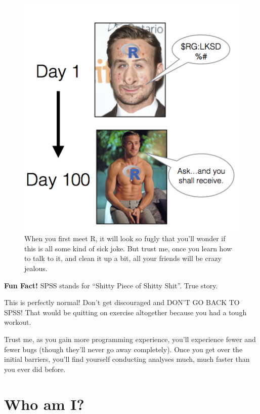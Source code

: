 \documentclass[]{book}
\theoremstyle{definition}
\theoremstyle{definition}
\theoremstyle{remark}
\begin{document}
\begin{figure}

{\centering \includegraphics{images/gosling} 

}

\caption{When you first meet R, it will look so fugly that you'll wonder if this is all some kind of sick joke. But trust me, once you learn how to talk to it, and clean it up a bit, all your friends will be crazy jealous.}\label{fig:unnamed-chunk-5}
\end{figure}

\textbf{Fun Fact!} SPSS stands for ``Shitty Piece of Shitty Shit''. True
story.

This is perfectly normal! Don't get discouraged and DON'T GO BACK TO
SPSS! That would be quitting on exercise altogether because you had a
tough workout.

Trust me, as you gain more programming experience, you'll experience
fewer and fewer bugs (though they'll never go away completely). Once you
get over the initial barriers, you'll find yourself conducting analyses
much, much faster than you ever did before.

\section{Who am I?}\label{who-am-i}
\end{document}
